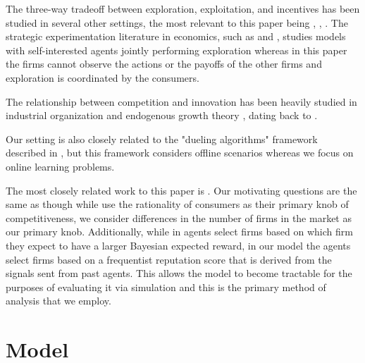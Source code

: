 \documentclass{article}
\theoremstyle{definition}
\begin{document}
The three-way tradeoff between exploration, exploitation, and incentives has been studied in several other settings, the most relevant to this paper being \citealt*{che2017recommender}, \citealt*{kremer2014implementing}, \citealt*{mansour2015bayesian}. The strategic experimentation literature in economics, such as \citealt*{bolton1999strategic} and \citealt*{keller2005strategic}, studies models with self-interested agents jointly performing exploration whereas in this paper the firms cannot observe the actions or the payoffs of the other firms and exploration is coordinated by the consumers.

The relationship between competition and innovation has been heavily studied in industrial organization \citep{tirole1988theory} and endogenous growth theory \citep{aghion2005competition, barro2004economic}, dating back to \citet{schumpeter2010capitalism}. 

Our setting is also closely related to the "dueling algorithms" framework described in \cite{immorlica2011dueling}, but this framework considers offline scenarios whereas we focus on online learning problems.

The most closely related work to this paper is \citealt*{mansour2018competing}. Our motivating questions are the same as \citet{mansour2018competing} though while \citet{mansour2018competing} use the rationality of consumers as their primary knob of competitiveness, we consider differences in the number of firms in the market as our primary knob. Additionally, while in \citet{mansour2018competing} agents select firms based on which firm they expect to have a larger Bayesian expected reward, in our model the agents select firms based on a frequentist reputation score that is derived from the signals sent from past agents. This allows the model to become tractable for the purposes of evaluating it via simulation and this is the primary method of analysis that we employ.

\section{Model}\label{section:2}
\end{document}
